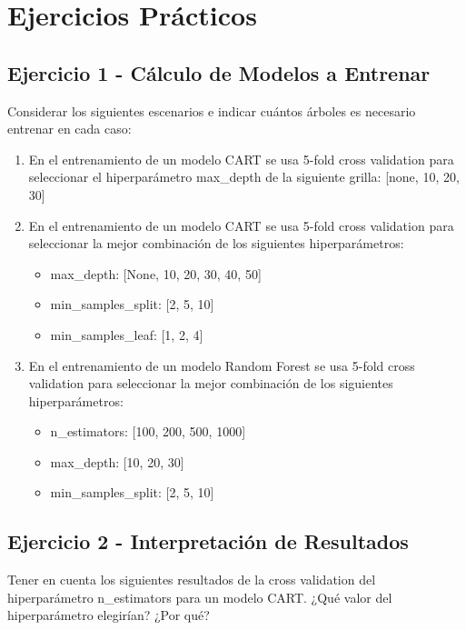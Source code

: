 \documentclass[12pt]{article}
\begin{document}
\section{Ejercicios Prácticos}

\subsection{Ejercicio 1 - Cálculo de Modelos a Entrenar}

Considerar los siguientes escenarios e indicar cuántos árboles es necesario entrenar en cada caso:

\begin{enumerate}
    \item En el entrenamiento de un modelo CART se usa 5-fold cross validation para seleccionar el hiperparámetro max\_depth de la siguiente grilla: [none, 10, 20, 30]
    
    \item En el entrenamiento de un modelo CART se usa 5-fold cross validation para seleccionar la mejor combinación de los siguientes hiperparámetros:
    \begin{itemize}
        \item max\_depth: [None, 10, 20, 30, 40, 50]
        \item min\_samples\_split: [2, 5, 10]
        \item min\_samples\_leaf: [1, 2, 4]
    \end{itemize}
    
    \item En el entrenamiento de un modelo Random Forest se usa 5-fold cross validation para seleccionar la mejor combinación de los siguientes hiperparámetros:
    \begin{itemize}
        \item n\_estimators: [100, 200, 500, 1000]
        \item max\_depth: [10, 20, 30]
        \item min\_samples\_split: [2, 5, 10]
    \end{itemize}
\end{enumerate}

\subsection{Ejercicio 2 - Interpretación de Resultados}

Tener en cuenta los siguientes resultados de la cross validation del hiperparámetro n\_estimators para un modelo CART. ¿Qué valor del hiperparámetro elegirían? ¿Por qué?
\end{document}
